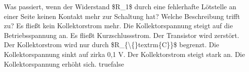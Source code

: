     {Was passiert, wenn der Widerstand \$R\_1\$ durch eine fehlerhafte Lötstelle an einer Seite keinen Kontakt mehr zur Schaltung hat? Welche Beschreibung trifft zu?}
    {Es fließt kein Kollektorstrom mehr. Die Kollektorspannung steigt auf die Betriebsspannung an.}
    {Es fließt Kurzschlussstrom. Der Transistor wird zerstört.}
    {Der Kollektorstrom wird nur durch \$R\_\{\textbackslash\{\}textrm\{C\}\}\$ begrenzt. Die Kollektorspannung sinkt auf zirka 0,1 V.}
    {Der Kollektorstrom steigt stark an. Die Kollektorspannung erhöht sich.}
    {true}{false}
